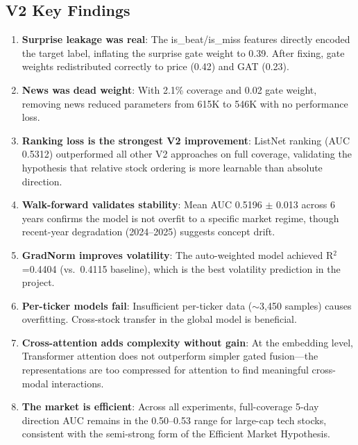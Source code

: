 \documentclass[12pt,a4paper]{article}
\begin{document}
\subsection{V2 Key Findings}
\label{sec:v2findings}

\begin{enumerate}
    \item \textbf{Surprise leakage was real}: The is\_beat/is\_miss features directly encoded the target label, inflating the surprise gate weight to 0.39. After fixing, gate weights redistributed correctly to price (0.42) and GAT (0.23).
    
    \item \textbf{News was dead weight}: With 2.1\% coverage and 0.02 gate weight, removing news reduced parameters from 615K to 546K with no performance loss.
    
    \item \textbf{Ranking loss is the strongest V2 improvement}: ListNet ranking (AUC 0.5312) outperformed all other V2 approaches on full coverage, validating the hypothesis that relative stock ordering is more learnable than absolute direction.
    
    \item \textbf{Walk-forward validates stability}: Mean AUC 0.5196 $\pm$ 0.013 across 6 years confirms the model is not overfit to a specific market regime, though recent-year degradation (2024--2025) suggests concept drift.
    
    \item \textbf{GradNorm improves volatility}: The auto-weighted model achieved R$^2$=0.4404 (vs.\ 0.4115 baseline), which is the best volatility prediction in the project.
    
    \item \textbf{Per-ticker models fail}: Insufficient per-ticker data ($\sim$3,450 samples) causes overfitting. Cross-stock transfer in the global model is beneficial.
    
    \item \textbf{Cross-attention adds complexity without gain}: At the embedding level, Transformer attention does not outperform simpler gated fusion---the representations are too compressed for attention to find meaningful cross-modal interactions.
    
    \item \textbf{The market is efficient}: Across all experiments, full-coverage 5-day direction AUC remains in the 0.50--0.53 range for large-cap tech stocks, consistent with the semi-strong form of the Efficient Market Hypothesis.
\end{enumerate}
\end{document}
